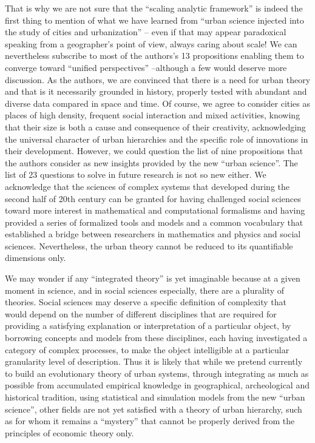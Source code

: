 \documentclass[10pt,letterpaper]{article}
\begin{document}
That is why we are not sure that the ``scaling analytic framework'' is indeed the first thing to mention of what we have learned from ``urban science injected into the study of cities and urbanization'' – even if that may appear paradoxical speaking from a geographer’s point of view, always caring about scale! We can nevertheless subscribe to most of the authors’s 13 propositions enabling them to converge toward ``unified perspectives'' –although a few would deserve more discussion. As the authors, we are convinced that there is a need for urban theory and that is it necessarily grounded in history, properly tested with abundant and diverse data compared in space and time. Of course, we agree to consider cities as places of high density, frequent social interaction and mixed activities, knowing that their size is both a cause and consequence of their creativity, acknowledging the universal character of urban hierarchies and the specific role of innovations in their development. However, we could question the list of nine propositions that the authors consider as new insights provided by the new ``urban science''. The list of 23 questions to solve in future research is not so new either. We acknowledge that the sciences of complex systems that developed during the second half of 20th century can be granted for having challenged social sciences toward more interest in mathematical and computational formalisms and having provided a series of formalized tools and models and a common vocabulary that established a bridge between researchers in mathematics and physics and social sciences. Nevertheless, the urban theory cannot be reduced to its quantifiable dimensions only.

We may wonder if any ``integrated theory'' is yet imaginable because at a given moment in science, and in social sciences especially, there are a plurality of theories. Social sciences may deserve a specific definition of complexity that would depend on the number of different disciplines that are required for providing a satisfying explanation or interpretation of a particular object, by borrowing concepts and models from these disciplines, each having investigated a category of complex processes, to make the object intelligible at a particular granularity level of description. Thus it is likely that while we pretend currently to build an evolutionary theory of urban systems, through integrating as much as possible from accumulated empirical knowledge in geographical, archeological and historical tradition, using statistical and simulation models from the new ``urban science'', other fields are not yet satisfied with a theory of urban hierarchy, such as \cite{krugman1996confronting} for whom it remains a ``mystery'' that cannot be properly derived from the principles of economic theory only.
\end{document}
